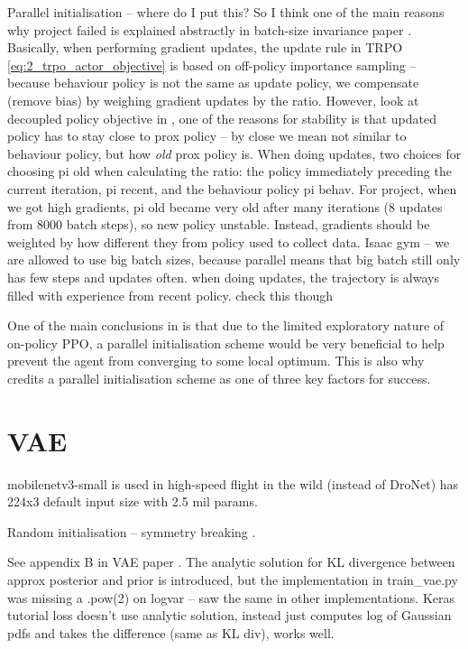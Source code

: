 Parallel initialisation -- where do I put this? So I think one of the main reasons why project failed is explained abstractly in batch-size invariance paper \cite{batchsizeInvariance}. Basically, when performing gradient updates, the update rule in TRPO \eqref{eq:2_trpo_actor_objective} is based on off-policy importance sampling -- because behaviour policy is not the same as update policy, we compensate (remove bias) by weighing gradient updates by the ratio. However, look at decoupled policy objective in \cite{batchsizeInvariance}, one of the reasons for stability is that updated policy has to stay close to prox policy -- by close we mean not similar to behaviour policy, but how \textit{old} prox policy is. When doing updates, two choices for choosing pi old when calculating the ratio: the policy immediately preceding the current iteration, pi recent, and the behaviour policy pi behav. For project, when we got high gradients, pi old became very old after many iterations (8 updates from 8000 batch steps), so new policy unstable. Instead, gradients should be weighted by how different they from policy used to collect data. 
Isaac gym -- we are allowed to use big batch sizes, because parallel means that big batch still only has few steps and updates often. when doing updates, the trajectory is always filled with experience from recent policy. check this though

One of the main conclusions in \cite{project_thesis} is that due to the limited exploratory nature of on-policy PPO, a parallel initialisation scheme would be very beneficial to help prevent the agent from converging to some local optimum. This is also why \cite{song2021droneRacing} credits a parallel initialisation scheme as one of three key factors for success.


\section{VAE}
mobilenetv3-small is used in high-speed flight in the wild (instead of DroNet) has 224x3 default input size with 2.5 mil params. 

Random initialisation -- symmetry breaking \cite{LectureNotesSparseAutoencoder}.

See appendix B in VAE paper \cite{variational_bayes}. The analytic solution for KL divergence between approx posterior and prior is introduced, but the implementation in train\_vae.py was missing a .pow(2) on logvar -- saw the same in other implementations. Keras tutorial loss doesn't use analytic solution, instead just computes log of Gaussian pdfs and takes the difference (same as KL div), works well.


